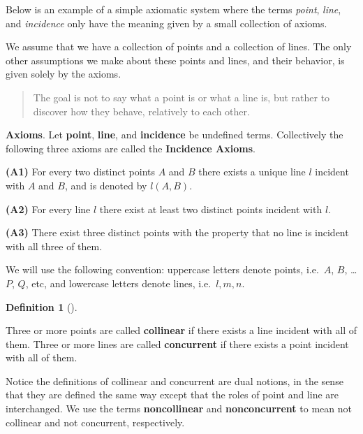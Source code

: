 \documentclass[
  letterpaper,
  10pt,
  reqno,
  twopage,
  openany]{book}
\theoremstyle{plain}
\theoremstyle{definition}
\theoremstyle{definition}
\newtheorem{definition}{Definition}[chapter]
\theoremstyle{definition}
\theoremstyle{plain}
\theoremstyle{plain}
\theoremstyle{remark}
\begin{document}
Below is an example of a simple axiomatic system where the terms
\emph{point}, \emph{line}, and \emph{incidence} only have the meaning
given by a small collection of axioms.

We assume that we have a collection of points and a collection of lines.
The only other assumptions we make about these points and lines, and
their behavior, is given solely by the axioms.

\begin{quote}
The goal is not to say what a point is or what a line is, but rather to
discover how they behave, relatively to each other.
\end{quote}

\textbf{Axioms}. Let  \textbf{point}, 
\textbf{line}, and  \textbf{incidence} be undefined
terms. Collectively the following three axioms are called the
 \textbf{Incidence Axioms}.

\textbf{(A1)} For every two distinct points \(A\) and \(B\) there exists
a unique line \(l\) incident with \(A\) and \(B\), and is denoted by
\(l(A,B)\).

\textbf{(A2)} For every line \(l\) there exist at least two distinct
points incident with \(l.\)

\textbf{(A3)} There exist three distinct points with the property that
no line is incident with all three of them.

We will use the following convention: uppercase letters denote points,
i.e.~\(A\), \(B\), \ldots \(P\), \(Q\), etc, and lowercase letters
denote lines, i.e.~\(l, m, n\).

\leavevmode{}%
\begin{definition}[]\label{def-collcom}

Three or more points are called  \textbf{collinear} if
there exists a line incident with all of them. Three or more lines are
called  \textbf{concurrent} if there exists a point
incident with all of them.

\end{definition}

Notice the definitions of collinear and concurrent are dual notions, in
the sense that they are defined the same way except that the roles of
point and line are interchanged. We use the terms 
\textbf{noncollinear} and  \textbf{nonconcurrent}
to mean not collinear and not concurrent, respectively.
\end{document}
